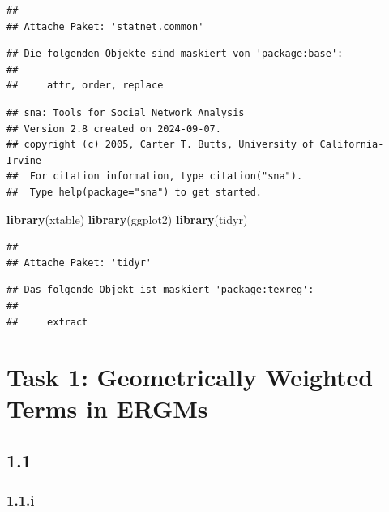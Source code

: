 \documentclass[
]{article}
\newenvironment{Shaded}{\begin{snugshade}}{\end{snugshade}}
\newcommand{\FunctionTok}[1]{\textcolor[rgb]{0.13,0.29,0.53}{\textbf{#1}}}
\newcommand{\NormalTok}[1]{#1}
\begin{document}
\begin{verbatim}
## 
## Attache Paket: 'statnet.common'
\end{verbatim}

\begin{verbatim}
## Die folgenden Objekte sind maskiert von 'package:base':
## 
##     attr, order, replace
\end{verbatim}

\begin{verbatim}
## sna: Tools for Social Network Analysis
## Version 2.8 created on 2024-09-07.
## copyright (c) 2005, Carter T. Butts, University of California-Irvine
##  For citation information, type citation("sna").
##  Type help(package="sna") to get started.
\end{verbatim}

\begin{Shaded}
\begin{Highlighting}[]
\FunctionTok{library}\NormalTok{(xtable)}
\FunctionTok{library}\NormalTok{(ggplot2)}
\FunctionTok{library}\NormalTok{(tidyr)}
\end{Highlighting}
\end{Shaded}

\begin{verbatim}
## 
## Attache Paket: 'tidyr'
\end{verbatim}

\begin{verbatim}
## Das folgende Objekt ist maskiert 'package:texreg':
## 
##     extract
\end{verbatim}

\section{Task 1: Geometrically Weighted Terms in
ERGMs}\label{task-1-geometrically-weighted-terms-in-ergms}

\subsection{1.1}\label{section}

\subsubsection{1.1.i}\label{i}
\end{document}
